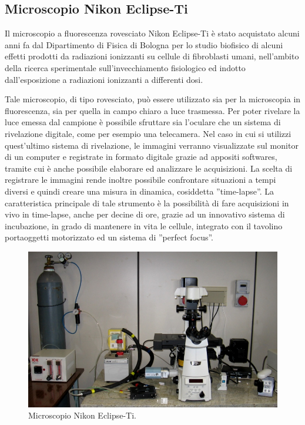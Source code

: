 \subsection{Microscopio Nikon Eclipse-Ti}

Il microscopio a fluorescenza rovesciato Nikon Eclipse-Ti è stato acquistato alcuni anni fa dal Dipartimento di Fisica di Bologna per lo studio biofisico di alcuni effetti prodotti da radiazioni ionizzanti su cellule di fibroblasti umani, nell'ambito della ricerca sperimentale sull'invecchiamento fisiologico ed indotto dall'esposizione a radiazioni ionizzanti a differenti dosi. 

Tale microscopio, di tipo rovesciato, può essere utilizzato sia per la microscopia in fluorescenza, sia per quella in campo chiaro a luce trasmessa.
Per poter rivelare la luce emessa dal campione è possibile sfruttare sia l'oculare che un sistema di rivelazione digitale, come per esempio una telecamera. Nel caso in cui si utilizzi quest'ultimo sistema di rivelazione, le immagini verranno visualizzate sul monitor di un computer e registrate in formato digitale grazie ad appositi softwares, tramite cui è anche possibile elaborare ed analizzare le acquisizioni. La scelta di registrare le immagini rende inoltre possibile confrontare situazioni a tempi diversi e quindi creare una misura in dinamica, cosiddetta ''time-lapse''. La caratteristica principale di tale strumento è la possibilità di fare acquisizioni in vivo in time-lapse, anche per decine di ore, grazie ad un innovativo sistema di incubazione, in grado di mantenere in vita le cellule, integrato con il tavolino portaoggetti motorizzato ed un sistema di ''perfect focus''.

\begin{figure}[!ht]
 \centering
 \includegraphics[scale=.45]{img/CAP2microNIKON.png}
 \caption{\small{Microscopio Nikon Eclipse-Ti.}}
 \label{fig:NIKON}
\end{figure}

